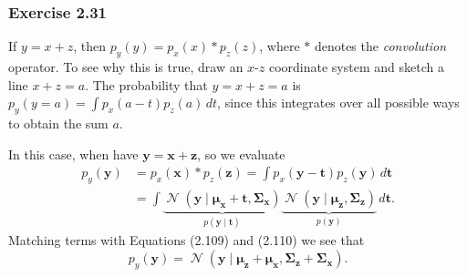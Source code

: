 \documentclass[12pt, a4paper]{article}
\newcommand{\vect}[1]{\bm{#1}}
\DeclareMathOperator{\N}{\mathcal{N}}
\begin{document}
\subsubsection*{Exercise 2.31}
If $y = x + z$, then $p_y(y) = p_x(x) * p_z(z)$, where $*$ denotes the \emph{convolution} operator.
To see why this is true, draw an $x$-$z$ coordinate system and sketch a line $x + z = a$.
The probability that $y = x + z = a$ is $p_y(y=a) = \int p_x(a - t) p_z(a) \, dt$, since this integrates over all possible ways to obtain the sum $a$.

In this case, when have $\vect{y} = \vect{x} + \vect{z}$, so we evaluate
\begin{align*}
	p_y(\vect{y}) &= p_x(\vect{x}) * p_z(\vect{z}) = 
	\int p_x(\vect{y} - \vect{t}) p_z(\vect{y}) \, d \vect{t} \\
	&=
	\int 
	\underbrace{\N \left( \vect{y} \mid \vect{\mu}_{\vect{x}} + \vect{t} , \vect{\Sigma}_{\vect{x}} \right) }_{p(\vect{y} \mid \vect{t})}
	\underbrace{\N \left( \vect{y} \mid \vect{\mu}_{\vect{z}} , 
	\vect{\Sigma}_{\vect{z}} \right)}_{p(\vect{y})}
	 \, d \vect{t}.
\end{align*}
Matching terms with Equations (2.109) and (2.110) we see that
\begin{equation*}
	p_y(\vect{y}) = \N \left( \vect{y} \mid 
	\vect{\mu}_{\vect{z}} + \vect{\mu}_{\vect{x}}
	, \vect{\Sigma}_{\vect{z}} + \vect{\Sigma}_{\vect{x}} \right).
\end{equation*}
\end{document}
